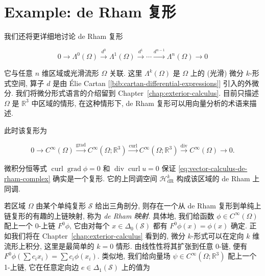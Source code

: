\section{{Example: de Rham 复形}}\label{sec:de-rham-complex}

{我们还将更详细地讨论 de Rham 复形}

\begin{equation}\label{eq:differential-forms-de-rham-complex}
0\to\Lambda^0(\Omega)\xrightarrow{d^0}\Lambda^1(\Omega)\xrightarrow{d^1}\cdots\xrightarrow{d^{n-1}}\Lambda^n(\Omega)\to0
\end{equation}

{它与任意 $n$ 维区域或光滑流形 $\Omega$ 关联. 这里 $\Lambda^k(\Omega)$ 是 $\Omega$ 上的 (光滑) 微分 $k$-形式空间, 算子 $d$ 是由 Élie Cartan [\ref{bib:cartan-differential-expressions}] 引入的外微分. 我们将微分形式语言的介绍留到 Chapter~\ref{chap:exterior-calculus}. 目前只描述 $\Omega$ 是 $\mathbb R^3$ 中区域的情形, 在这种情形下, de Rham 复形可以用向量分析的术语来描述.}

{此时该复形为}

\begin{equation}\label{eq:vector-calculus-de-rham-complex}
0\to C^\infty(\Omega)\xrightarrow{\operatorname{grad}}C^\infty(\Omega;\mathbb R^3)\xrightarrow{\operatorname{curl}}C^\infty(\Omega;\mathbb R^3)\xrightarrow{\operatorname{div}}C^\infty(\Omega)\to0.
\end{equation}

{微积分恒等式 $\operatorname{curl}\operatorname{grad}\phi=0$ 和 $\operatorname{div}\operatorname{curl}u=0$ 保证 \eqref{eq:vector-calculus-de-rham-complex} 确实是一个复形. 它的上同调空间 $\mathcal H^k_{\mathrm{dR}}$ 构成该区域的 de Rham 上同调.}

{若区域 $\Omega$ 由某个单纯复形 $\mathcal S$ 给出三角剖分, 则存在一个从 de Rham 复形到单纯上链复形的有趣的上链映射, 称为 \emph{de Rham 映射}. 具体地, 我们给函数 $\phi\in C^\infty(\Omega)$ 配上一个 0-上链 $F^0\phi$, 它由对每个 $x\in\Delta_0(\mathcal S)$ 都有 $F^0\phi(x)=\phi(x)$ 确定. 正如我们将在 Chapter~\ref{chap:exterior-calculus} 看到的, 微分 $k$-形式可以在定向 $k$ 维流形上积分, 这里是最简单的 $k=0$ 情形. 由线性性将其扩张到任意 0-链, 便有 $F^0\phi(\sum c_ix_i)=\sum c_i\phi(x_i)$. 类似地, 我们给向量场 $\psi\in C^\infty(\Omega;\mathbb R^3)$ 配上一个 1-上链, 它在任意定向边 $e\in\Delta_1(\mathcal S)$ 上的值为}

